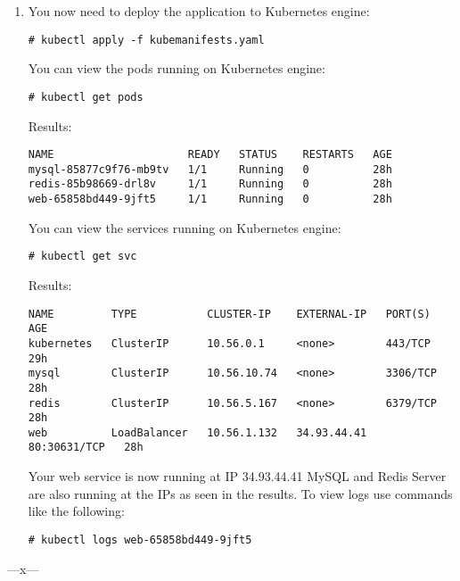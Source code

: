 \documentclass{article}
\begin{document}
\begin{enumerate}
\item
You now need to deploy the application to Kubernetes engine:
\begin{lstlisting}
# kubectl apply -f kubemanifests.yaml
\end{lstlisting}
\pagebreak
You can view the pods running on Kubernetes engine:
\begin{lstlisting}
# kubectl get pods
\end{lstlisting}
Results:
\begin{lstlisting}
NAME                     READY   STATUS    RESTARTS   AGE
mysql-85877c9f76-mb9tv   1/1     Running   0          28h
redis-85b98669-drl8v     1/1     Running   0          28h
web-65858bd449-9jft5     1/1     Running   0          28h
\end{lstlisting}
You can view the services running on Kubernetes engine:
\begin{lstlisting}
# kubectl get svc
\end{lstlisting}
Results:
\begin{lstlisting}
NAME         TYPE           CLUSTER-IP    EXTERNAL-IP   PORT(S)        AGE
kubernetes   ClusterIP      10.56.0.1     <none>        443/TCP        29h
mysql        ClusterIP      10.56.10.74   <none>        3306/TCP       28h
redis        ClusterIP      10.56.5.167   <none>        6379/TCP       28h
web          LoadBalancer   10.56.1.132   34.93.44.41   80:30631/TCP   28h
\end{lstlisting}
Your web service is now running at IP 34.93.44.41
MySQL and Redis Server are also running at the IPs as seen in the results.
To view logs use commands like the following:
\begin{lstlisting}
# kubectl logs web-65858bd449-9jft5
\end{lstlisting}
\end{enumerate}
\begin{center}
---x---
\end{center}
\end{document}
